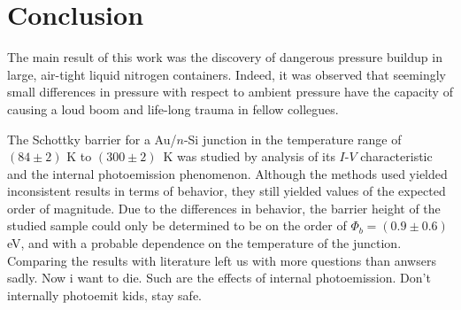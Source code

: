 \section{Conclusion}
The main result of this work was the discovery of dangerous pressure buildup in large, air-tight liquid nitrogen containers.
Indeed, it was observed that seemingly small differences in pressure with respect to ambient pressure have the capacity of causing a loud boom and life-long trauma in fellow collegues.

The Schottky barrier for a Au/$n$-Si junction in the temperature range of $(84 \pm 2)$ K to \mbox{$(300 \pm 2)$ K} was studied by analysis of its $I$-$V$ characteristic and the internal photoemission phenomenon.
Although the methods used yielded inconsistent results in terms of behavior, they still yielded values of the expected order of magnitude.
Due to the differences in behavior, the barrier height of the studied sample could only be determined to be on the order of $\Phi_b = (0.9 \pm 0.6)$ eV, and with a probable dependence on the temperature of the junction. Comparing the results with literature left us with more questions than anwsers sadly. Now i want to die. Such are the effects of internal photoemission. Don't internally photoemit kids, stay safe.
